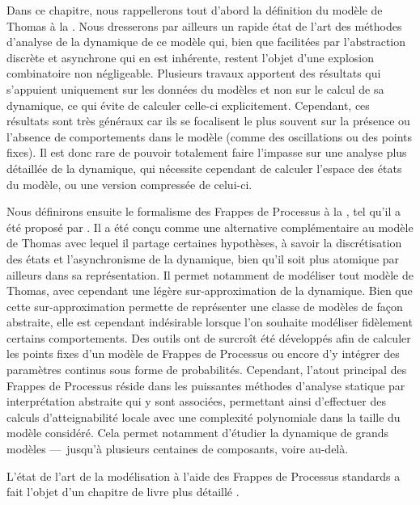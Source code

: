 Dans ce chapitre, nous rappellerons tout d'abord la définition du modèle de Thomas
à la .
Nous dresserons par ailleurs un rapide état de l'art des méthodes d'analyse
de la dynamique de ce modèle qui, bien que facilitées par
l'abstraction discrète et asynchrone qui en est inhérente,
restent l'objet d'une explosion combinatoire non négligeable.
Plusieurs travaux apportent des résultats qui s'appuient uniquement sur les données
du modèles et non sur le calcul de sa dynamique,
ce qui évite de calculer celle-ci explicitement.
Cependant, ces résultats sont très généraux
car ils se focalisent le plus souvent sur la présence ou l'absence de comportements
dans le modèle (comme des oscillations ou des points fixes).
Il est donc rare de pouvoir totalement faire l'impasse
sur une analyse plus détaillée de la dynamique,
qui nécessite cependant de calculer l'espace des états du modèle,
ou une version compressée de celui-ci.

Nous définirons ensuite le formalisme des Frappes de Processus
à la , tel qu'il a été proposé par .
Il a été conçu comme une alternative complémentaire au modèle de Thomas
avec lequel il partage certaines hypothèses, à savoir la discrétisation des états
et l'asynchronisme de la dynamique,
bien qu'il soit plus atomique par ailleurs dans sa représentation.
Il permet notamment de modéliser tout modèle de Thomas,
avec cependant une légère sur-approximation de la dynamique.
Bien que cette sur-approximation permette de représenter une classe de modèles de façon
abstraite, elle est cependant indésirable lorsque l'on souhaite modéliser
fidèlement certains comportements.
Des outils ont de surcroît été développés afin de calculer les points fixes d'un modèle de
Frappes de Processus ou encore d'y intégrer des paramètres continus
sous forme de probabilités.
Cependant, l'atout principal des Frappes de Processus réside dans les puissantes
méthodes d'analyse statique par interprétation abstraite qui y sont associées,
permettant ainsi d'effectuer des calculs d'atteignabilité locale
avec une complexité polynomiale dans la taille du modèle considéré.
Cela permet notamment d'étudier la dynamique de grands modèles
---~jusqu'à plusieurs centaines de composants, voire au-delà.

\myskip

L'état de l'art de la modélisation à l'aide des Frappes de Processus standards
a fait l'objet d'un chapitre de livre plus détaillé \cite*{pauleve14}.






